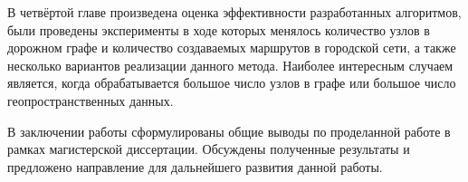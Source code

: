 В четвёртой главе произведена оценка эффективности разработанных алгоритмов, были проведены эксперименты в 
ходе которых менялось количество узлов в дорожном графе и количество создаваемых маршрутов в городской сети, 
а также несколько вариантов реализации данного метода. Наиболее интересным случаем является, когда 
обрабатывается большое число узлов в графе или большое число геопространственных данных.

В заключении работы сформулированы общие выводы по проделанной работе в рамках магистерской диссертации. 
Обсуждены полученные результаты и предложено направление для дальнейшего развития данной работы.